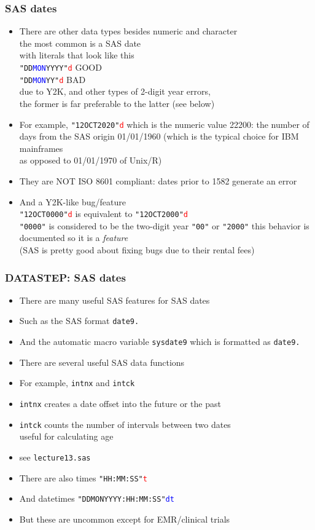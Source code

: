 \documentclass[11pt,pdftex,dvipsnames,usenames,helvetica]{beamer}
\begin{document}
\begin{frame}[fragile]
\frametitle{SAS dates}
\begin{itemize}
\item There are other data types besides numeric and character\\ 
the most common is a SAS date\\
with literals that look like this\\
{\tt "DD\textcolor{blue}{MON}YYYY"\textcolor{red}{d}} GOOD\\
 {\tt "DD\textcolor{blue}{MON}YY"\textcolor{red}{d}} BAD\\
due to Y2K, and other types of 2-digit year errors,\\
 the former is far preferable to the latter (see below)
\item For example, {\tt "12OCT2020"\textcolor{red}{d}}
which is the numeric value 22200: the number of days
from the SAS origin 01/01/1960 
(which is the typical choice for IBM mainframes\\
as opposed to 01/01/1970 of Unix/R)
\item They are NOT ISO 8601 compliant: dates prior to 1582 generate an error
\item And a Y2K-like bug/feature\\
{\tt "12OCT0000"\textcolor{red}{d}}
  is equivalent to {\tt "12OCT2000"\textcolor{red}{d}}\\
  {\tt "0000"} is considered to be the two-digit year {\tt "00"} or
  {\tt "2000"}
  this behavior is documented so it is a {\it feature}\\
  (SAS is pretty good about fixing bugs due to their rental fees)\\
\end{itemize}
\end{frame}

\begin{frame}[fragile]
\frametitle{DATASTEP: SAS dates}
\begin{itemize}
\item There are many useful SAS features for SAS dates
\item Such as the SAS format {\tt date9.}
\item And the automatic macro variable {\tt sysdate9}
which is formatted as {\tt date9.}
\item There are several useful SAS data functions
\item For example, {\tt intnx} and {\tt intck} 
\item {\tt intnx} creates a date offset into the future or the past
\item {\tt intck} counts the number of intervals between two dates\\
useful for calculating age
\item see {\tt lecture13.sas}
\item There are also times {\tt "HH:MM:SS"\textcolor{red}{t}}
\item And datetimes 
{\tt "DD{MON}YYYY:HH:MM:SS"\textcolor{blue}{dt}}
\item But these are uncommon except for EMR/clinical trials
\end{itemize}
\end{frame}
\end{document}
